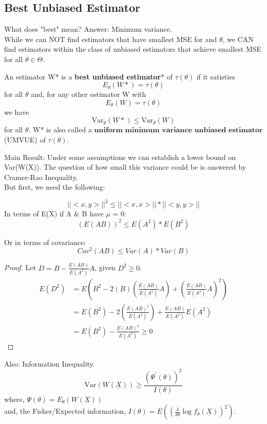 \documentclass[11pt,fleqn]{book} %
\begin{document}
\subsection{Best Unbiased Estimator}
		What does "best" mean? Answer: Minimum variance. \\
	
	While we can NOT find estimators that have smallest MSE for and $\theta$, we CAN find estimators within the class of unbiased estimators that achieve smallest MSE for all $\theta \in \Theta$.\\

	\begin{definition}
		An estimator W* is a \textbf{best unbiased estimator}* of $\tau(\theta)$ if it satisties
		\[
			E_\theta (W*) = \tau(\theta)
		\] 
		for all $\theta$ and, for any other estimator W with 
		\[
			E_\theta (W) = \tau(\theta)
		\]
		we have 
		\[
			\text{Var}_\theta (W*) \le \text{Var}_\theta (W)
		\]
		for all $\theta$. W* is also called a $\textbf{uniform minimum variance unbiased estimator}$ (UMVUE) of $\tau(\theta)$.
	\end{definition}

	Main Result: Under some assumptions we can establish a lower bound on Var(W(X)). The question of how small this variance could be is answered by Cramer-Rao Inequality.\\

	But first, we need the following:

	\begin{theorem}
		$$||<x,y>||^2 \le ||<x,x>|| * ||<y,y>||$$
	In terms of E(X) if A \& B have $\mu$ = 0:
	$$(E(AB))^2 \le E(A^2) * E(B^2)$$

	Or in terms of covariance:
	$$Cov^2(AB) \le Var(A)*Var(B)$$
	\end{theorem}
	
	\begin{proof}
	Let $D = B - \frac{E(AB)}{E(A^2)}A$, given $D^2 \ge 0$.
		\begin{align*}
			E(D^2) &= E(B^2 - 2(B)(\frac{E(AB)}{E(A^2)}A)+(\frac{E(AB)}{E(A^2)}A)^2)\\
				&= E(B^2)-2\left( \frac{E(AB)^2}{E(A^2)} \right) + \frac{E(AB)}{E(A^2)}E(A^2)\\
				&= E(B^2) - \frac{E(AB)^2}{E(A^2)} \ge 0
		\end{align*}	
	\end{proof}

	\begin{theorem}
		Also: Information Inequality. 
		$$\text{Var}(W(\underline{X})) \ge \frac{(\Psi^\prime(\theta))^2}{I(\theta)}$$
		where, 
		$\Psi(\theta)=E_\theta(W(\underline{X}))$\\
		and, 
		the Fisher/Expected information, $I(\theta)=E\left((\frac{\delta}{\delta \theta}\log f_\theta(\underline{X}))^2 \right)$.

		
	\end{theorem}
\end{document}
